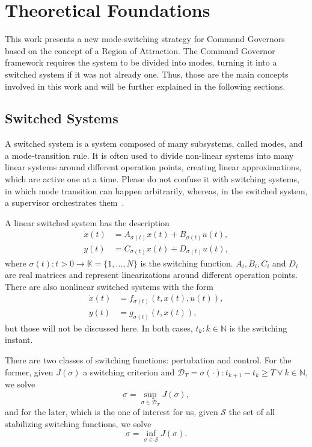 
\chapter{Theoretical Foundations}%
\label{chp:theoretical-foundations}

This work presents a new mode-switching strategy for Command Governors based on
the concept of a Region of Attraction. The Command Governor framework requires
the system to be divided into modes, turning it into a switched system if it was
not already one. Thus, those are the main concepts involved in this work and
will be further explained in the following sections.

\section{Switched Systems}%
\label{sec:switched-systems}

A switched system is a system composed of many subsystems, called modes, and a
mode-transition rule. It is often used to divide non-linear systems into many
linear systems around different operation points, creating linear
approximations, which are active one at a time. Please do not confuse it with
switching systems, in which mode transition can happen arbitrarily, whereas, in
the switched system, a supervisor orchestrates
them~\parencite{lucia.franzè:stabilization,liberzon.morse:basic}.

A linear switched system has the description
%
\begin{align}
  \dot{x}(t) & = A_{\sigma(t)}x(t) + B_{\sigma(t)}u(t), \\
  y(t)       & = C_{\sigma(t)}x(t) + D_{\sigma(t)}u(t),
\end{align}
%
where \(\sigma(t):t>0\rightarrow\mathbb{K}=\{1,\ldots,N\}\) is the switching function.
\(A_{i}, B_{i}, C_{i}\) and \(D_{i}\) are real matrices and represent
linearizations around different operation points. There are also nonlinear
switched systems with the form
%
\begin{align}
  \dot{x}(t) & = f_{\sigma(t)}(t,x(t),u(t)), \\
  y(t)       & = g_{\sigma(t)}(t,x(t)),
\end{align}
%
but those will not be discussed here. In both cases, \(t_{k}:k\in\mathbb{N}\) is
the switching instant.

There are two classes of switching functions: pertubation and control. For the
former, given \(J(\sigma)\) a switching criterion and
\(\mathcal{D}_{T}=\sigma(\cdot):t_{k+1}-t_{k}\ge{}T~\forall{}~k\in{}\mathbb{N}\), we solve
%
\begin{equation}
  \sigma = \sup_{\sigma\in\mathcal{D}_{T}} J(\sigma),
\end{equation}
%
and for the later, which is the one of interest for us, given \(\mathcal{S}\)
the set of all stabilizing switching functions, we solve
%
\begin{equation}
  \sigma = \inf_{\sigma\in\mathcal{S}} J(\sigma).
\end{equation}

